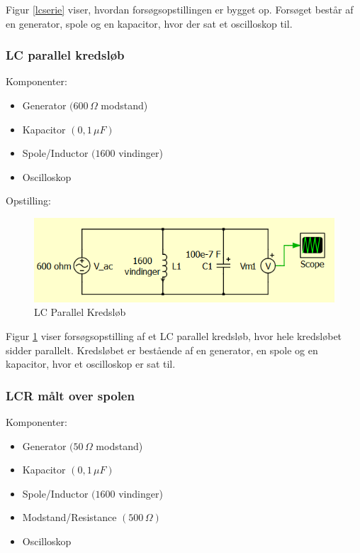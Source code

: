 Figur \ref{lcserie} viser, hvordan forsøgsopstillingen er bygget op. Forsøget består af en generator, spole og en kapacitor, hvor der sat et oscilloskop til.

\subsubsection{LC parallel kredsløb}

Komponenter:

\begin{itemize}
\item Generator $(600\, \Omega$ modstand)
\item Kapacitor $( 0,1\, \mu F)$
\item Spole/Inductor $(1600$ vindinger)
\item Oscilloskop
\end{itemize}

Opstilling:

\begin{figure}[H]
\centering
\includegraphics[scale=1]{Vildledning/Schematics/Kredslb/LC_Parallel}
\caption{LC Parallel Kredsløb}
\label{lcparallel}
\end{figure}

Figur \ref{lcparallel} viser forsøgsopstilling af et LC parallel kredsløb, hvor hele kredsløbet sidder parallelt. Kredsløbet er bestående af en generator, en spole og en kapacitor, hvor et oscilloskop er sat til.

\subsubsection{LCR målt over spolen}

Komponenter:

\begin{itemize}
\item Generator $(50\, \Omega$ modstand)
\item Kapacitor $( 0,1\, \mu F)$
\item Spole/Inductor $(1600$ vindinger)
\item Modstand/Resistance $(500\, \Omega)$
\item Oscilloskop
\end{itemize}

